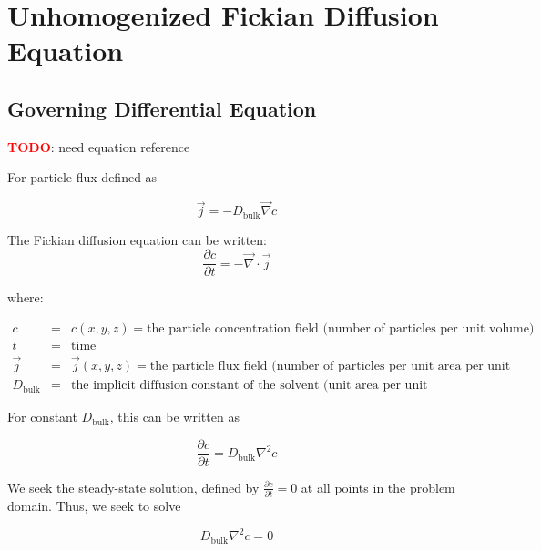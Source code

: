 
\section{Unhomogenized Fickian Diffusion Equation}\label{sec:unhom_fick}

\subsection{Governing Differential Equation}\label{subsec:unhom_fick_gov}

\textcolor{red}{\textbf{TODO}}: need equation reference


For particle flux defined as 

\begin{equation}
\vec{j} = - D_{\mathrm{bulk}} \vec{\nabla} c
\end{equation}

The Fickian diffusion equation can be written:
\begin{equation}
\frac{\partial c}{\partial t} = - \vec{\nabla} \cdot \vec{j}
\end{equation}

where:

$\begin{array}{rcl}
c & = & c(x,y,z) = \text{the particle concentration field (number of particles per unit volume)} \\
t & = & \text{time} \\
\vec{j} & = & \vec{j}(x,y,z) = \text{the particle flux field (number of particles per unit area per unit time)} \\
D_{\mathrm{bulk}} & = & \text{the implicit diffusion constant of the solvent (unit area per unit time)}
\end{array}$

For constant $D_{\mathrm{bulk}}$, this can be written as

\begin{equation}
\frac{\partial c}{\partial t} = D_{\mathrm{bulk}} \nabla^2 c
\end{equation}

We seek the steady-state solution, defined by
$\frac{\partial c}{\partial t} = 0$ at all points in the problem domain.
Thus, we seek to solve

\begin{equation}
D_{\mathrm{bulk}} \nabla^2 c = 0
\end{equation}

